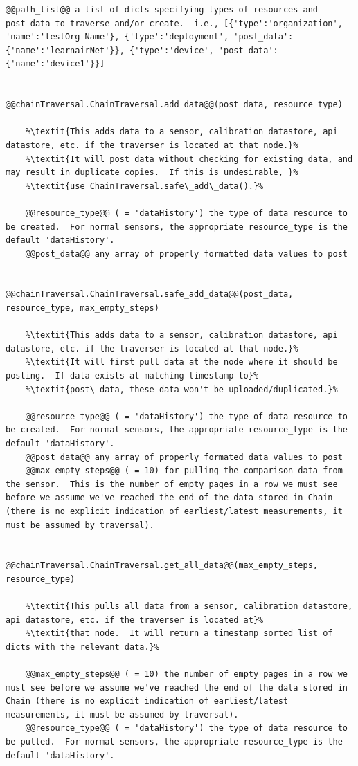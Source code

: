 \begin{lstlisting}[style=codedef]
	@@path_list@@ a list of dicts specifying types of resources and post_data to traverse and/or create.  i.e., [{'type':'organization', 'name':'testOrg Name'}, {'type':'deployment', 'post_data':{'name':'learnairNet'}}, {'type':'device', 'post_data':{'name':'device1'}}]


@@chainTraversal.ChainTraversal.add_data@@(post_data, resource_type)

	%\textit{This adds data to a sensor, calibration datastore, api datastore, etc. if the traverser is located at that node.}%
	%\textit{It will post data without checking for existing data, and may result in duplicate copies.  If this is undesirable, }%
	%\textit{use ChainTraversal.safe\_add\_data().}%  

	@@resource_type@@ ( = 'dataHistory') the type of data resource to be created.  For normal sensors, the appropriate resource_type is the default 'dataHistory'.
	@@post_data@@ any array of properly formatted data values to post


@@chainTraversal.ChainTraversal.safe_add_data@@(post_data, resource_type, max_empty_steps)

	%\textit{This adds data to a sensor, calibration datastore, api datastore, etc. if the traverser is located at that node.}%
	%\textit{It will first pull data at the node where it should be posting.  If data exists at matching timestamp to}%
	%\textit{post\_data, these data won't be uploaded/duplicated.}%  

	@@resource_type@@ ( = 'dataHistory') the type of data resource to be created.  For normal sensors, the appropriate resource_type is the default 'dataHistory'.
	@@post_data@@ any array of properly formated data values to post
	@@max_empty_steps@@ ( = 10) for pulling the comparison data from the sensor.  This is the number of empty pages in a row we must see before we assume we've reached the end of the data stored in Chain (there is no explicit indication of earliest/latest measurements, it must be assumed by traversal).


@@chainTraversal.ChainTraversal.get_all_data@@(max_empty_steps, resource_type)

	%\textit{This pulls all data from a sensor, calibration datastore, api datastore, etc. if the traverser is located at}%
	%\textit{that node.  It will return a timestamp sorted list of dicts with the relevant data.}%

	@@max_empty_steps@@ ( = 10) the number of empty pages in a row we must see before we assume we've reached the end of the data stored in Chain (there is no explicit indication of earliest/latest measurements, it must be assumed by traversal).
	@@resource_type@@ ( = 'dataHistory') the type of data resource to be pulled.  For normal sensors, the appropriate resource_type is the default 'dataHistory'.

\end{lstlisting}



